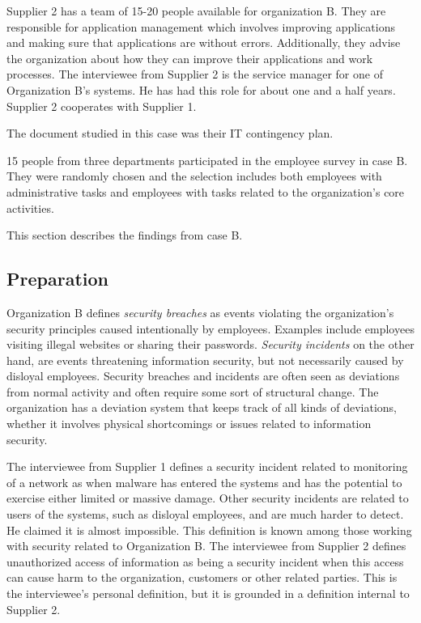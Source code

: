 \documentclass[b5paper, twoside, openright, 11pt]{report}
\begin{document}
Supplier 2 has a team of 15-20 people available for organization B. They are responsible for application management which involves improving applications and making sure that applications are without errors. Additionally, they advise the organization about how they can improve their applications and work processes. The interviewee from Supplier 2 is the service manager for one of Organization B's systems. He has had this role for about one and a half years. Supplier 2 cooperates with Supplier 1.

The document studied in this case was their IT contingency plan.

15 people from three departments participated in the employee survey in case B. They were randomly chosen and the selection includes both employees with administrative tasks and employees with tasks related to the organization's core activities.

This section describes the findings from case B.

\subsection{Preparation}
Organization B defines \textit{security breaches} as events violating the organization's security principles caused intentionally by employees. Examples include employees visiting illegal websites or sharing their passwords. \textit{Security incidents} on the other hand, are events threatening information security, but not necessarily caused by disloyal employees. Security breaches and incidents are often seen as deviations from normal activity and often require some sort of structural change. The organization has a deviation system that keeps track of all kinds of deviations, whether it involves physical shortcomings or issues related to information security.

The interviewee from Supplier 1 defines a security incident related to monitoring of a network as when malware has entered the systems and has the potential to exercise either limited or massive damage. Other security incidents are related to users of the systems, such as disloyal employees, and are much harder to detect. He claimed it is almost impossible. This definition is known among those working with security related to Organization B. The interviewee from Supplier 2 defines unauthorized access of information as being a security incident when this access can cause harm to the organization, customers or other related parties. This is the interviewee's personal definition, but it is grounded in a definition internal to Supplier 2.
\end{document}
